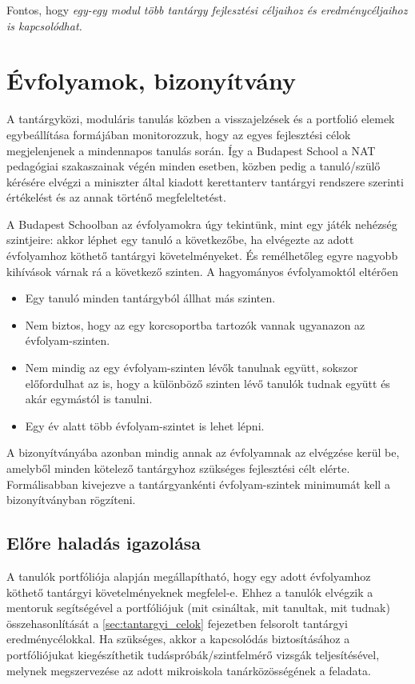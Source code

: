 Fontos, hogy \emph{egy-egy modul több tantárgy fejlesztési céljaihoz és eredménycéljaihoz is kapcsolódhat.}

\section{Évfolyamok, bizonyítvány}
\label{sec:evfolyamok}

A tantárgyközi, moduláris tanulás közben a visszajelzések és a portfolió elemek egybeállítása formájában monitorozzuk, hogy az egyes fejlesztési célok megjelenjenek a mindennapos tanulás során. Így a Budapest School a NAT pedagógiai szakaszainak végén minden esetben, közben pedig a tanuló/szülő kérésére elvégzi a miniszter által kiadott kerettanterv tantárgyi rendszere szerinti értékelést és az annak történő megfeleltetést.

A Budapest Schoolban az évfolyamokra úgy tekintünk, mint egy játék nehézség szintjeire: akkor léphet egy tanuló a következőbe, ha elvégezte az adott évfolyamhoz köthető tantárgyi követelményeket. És remélhetőleg egyre nagyobb kihívások várnak rá a következő szinten. A hagyományos évfolyamoktól eltérően

\begin{itemize}
\item Egy tanuló minden tantárgyból állhat más szinten.
\item Nem biztos, hogy az egy korcsoportba tartozók vannak ugyanazon az évfolyam-szinten.
\item Nem mindig az egy évfolyam-szinten lévők tanulnak együtt, sokszor előfordulhat az is, hogy a különböző szinten lévő tanulók tudnak együtt és akár egymástól is tanulni.
\item Egy év alatt több évfolyam-szintet is lehet lépni.
\end{itemize}

 A bizonyítványába azonban mindig annak az évfolyamnak az elvégzése kerül be, amelyből minden kötelező tantárgyhoz szükséges fejlesztési célt elérte. Formálisabban kivejezve a tantárgyankénti évfolyam-szintek minimumát kell a bizonyítványban rögzíteni.

\subsection{Előre haladás igazolása}
A tanulók portfóliója alapján megállapítható, hogy egy adott évfolyamhoz köthető tantárgyi követelményeknek megfelel-e. Ehhez a tanulók elvégzik a mentoruk segítségével a portfóliójuk (mit csináltak, mit tanultak, mit tudnak) összehasonlítását a \ref{sec:tantargyi_celok} fejezetben felsorolt tantárgyi eredménycélokkal. Ha szükséges, akkor a kapcsolódás biztosításához a portfóliójukat kiegészíthetik tudáspróbák/szintfelmérő vizsgák teljesítésével, melynek megszervezése az adott mikroiskola tanárközösségének a feladata.

